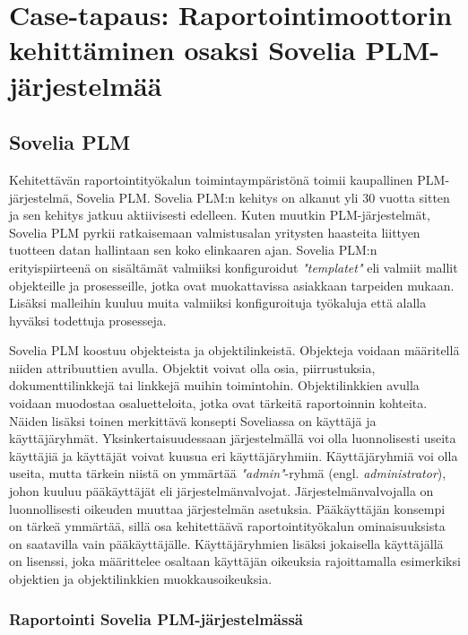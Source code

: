 \chapter{Case-tapaus: Raportointimoottorin kehittäminen osaksi Sovelia PLM-järjestelmää} \label{Case-tapaus: Raportointimoottorin kehittäminen osaksi Sovelia PLM-järjestelmää}

\section{Sovelia PLM} \label{PLM-järjestelmät}

Kehitettävän raportointityökalun toimintaympäristönä toimii kaupallinen PLM-järjestelmä, Sovelia PLM. Sovelia PLM:n kehitys on alkanut yli 30 vuotta sitten ja sen kehitys jatkuu aktiivisesti edelleen. Kuten muutkin PLM-järjestelmät, Sovelia PLM pyrkii ratkaisemaan valmistusalan yritysten haasteita liittyen tuotteen datan hallintaan sen koko elinkaaren ajan. \cite{soveliaAboutSovelia} Sovelia PLM:n erityispiirteenä on sisältämät valmiiksi konfiguroidut \textit{"templatet"} eli valmiit mallit objekteille ja prosesseille, jotka ovat muokattavissa asiakkaan tarpeiden mukaan. Lisäksi malleihin kuuluu muita valmiiksi konfiguroituja työkaluja että alalla hyväksi todettuja prosesseja. \cite{soveliaSoveliaGetting}

Sovelia PLM koostuu objekteista ja objektilinkeistä. Objekteja voidaan määritellä niiden attribuuttien avulla. Objektit voivat olla osia, piirrustuksia, dokumenttilinkkejä tai linkkejä muihin toimintohin. \cite{soveliaSoveliaGetting} Objektilinkkien avulla voidaan muodostaa osaluetteloita, jotka ovat tärkeitä raportoinnin kohteita. Näiden lisäksi toinen merkittävä konsepti Soveliassa on käyttäjä ja käyttäjäryhmät. Yksinkertaisuudessaan järjestelmällä voi olla luonnolisesti useita käyttäjiä ja käyttäjät voivat kuusua eri käyttäjäryhmiin. Käyttäjäryhmiä voi olla useita, mutta tärkein niistä on ymmärtää \textit{"admin"}-ryhmä (engl. \textit{administrator}), johon kuuluu pääkäyttäjät eli järjestelmänvalvojat. Järjestelmänvalvojalla on luonnollisesti oikeuden muuttaa järjestelmän asetuksia. Pääkäyttäjän konsempi on tärkeä ymmärtää, sillä osa kehitettäävä raportointityökalun ominaisuuksista on saatavilla vain pääkäyttäjälle. Käyttäjäryhmien lisäksi jokaisella käyttäjällä on lisenssi, joka määrittelee osaltaan käyttäjän oikeuksia rajoittamalla esimerkiksi objektien ja objektilinkkien muokkausoikeuksia. \cite{soveliaUserManagement}

\subsection{Raportointi Sovelia PLM-järjestelmässä}

